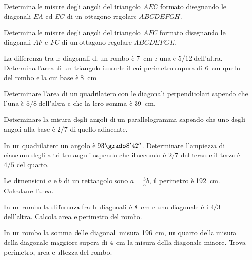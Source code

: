 \begin{multicols}{2}
\begin{esercizio}
\label{ese:7.56}
Determina le misure degli angoli del triangolo $AEC$ formato 
disegnando le diagonali $EA$ ed $EC$ di un ottagono regolare 
$ABCDEFGH$.
\end{esercizio}

\begin{esercizio}
\label{ese:7.57}
Determina le misure degli angoli del triangolo $AFC$ formato 
disegnando le diagonali $AF$ e $FC$ di un ottagono regolare 
$ABCDEFGH$.
\end{esercizio}

\begin{esercizio}
\label{ese:7.58}
La differenza tra le diagonali di un rombo è 7~cm e una è $5/12$ 
dell'altra. Determina l'area di un triangolo isoscele il cui 
perimetro supera di 6~cm quello del rombo e la cui base è 8~cm.
\end{esercizio}

\begin{esercizio}
\label{ese:7.59}
Determinare l'area di un quadrilatero con le diagonali perpendicolari 
sapendo che l'una è $5/8$ dell'altra e che la loro somma è 39~cm.
\end{esercizio}

\begin{esercizio}
\label{ese:7.60}
Determinare la misura degli angoli di un parallelogramma sapendo che 
uno degli angoli alla base è $2/7$ di quello adiacente.
\end{esercizio}

\begin{esercizio}
\label{ese:7.61}
In un quadrilatero un angolo è $93\grado8'42''$. Determinare 
l'ampiezza di ciascuno degli altri tre angoli sapendo che il secondo 
è $2/7$ del terzo e il terzo è $4/5$ del quarto.
\end{esercizio}

\begin{esercizio}
\label{ese:7.62}
Le dimensioni $a$ e $b$ di un rettangolo sono $a=\frac{3}{5}b$, il 
perimetro è 192~cm. Calcolane l'area.
\end{esercizio}

\begin{esercizio}
\label{ese:7.63}
In un rombo la differenza fra le diagonali è 8~cm e una diagonale è i 
$4/3$ dell'altra. Calcola area e perimetro del rombo.
\end{esercizio}

\begin{esercizio}
\label{ese:7.64}
In un rombo la somma delle diagonali misura 196~cm, un quarto della 
misura della diagonale maggiore supera di 4~cm la misura della 
diagonale minore. Trova perimetro, area e altezza del rombo.
\end{esercizio}


\end{multicols}
